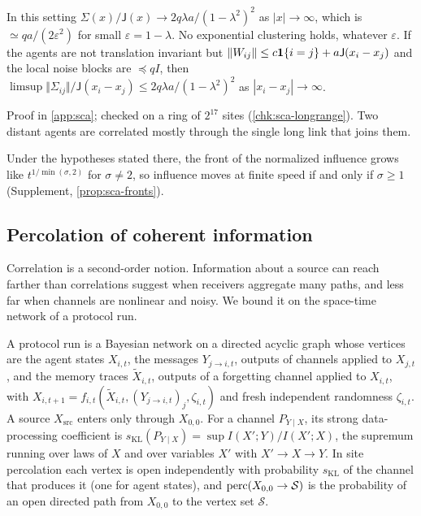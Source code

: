 \begin{proposition}\label{prop:sca-longrange}
In this setting $\Sigma(x)/\mathsf J(x)\to2q\lambda a/(1-\lambda^2)^2$ as $|x|\to\infty$, which is $\simeq qa/(2\varepsilon^2)$ for small $\varepsilon=1-\lambda$. No exponential clustering holds, whatever $\varepsilon$. If the agents are not translation invariant but $\Vert W_{ij}\Vert\le c\mathbf{1}\{i=j\}+a\mathsf J(x_i-x_j)$ and the local noise blocks are $\preceq qI$, then $\limsup\Vert\Sigma_{ij}\Vert/\mathsf J(x_i-x_j)\le2q\lambda a/(1-\lambda^2)^2$ as $|x_i-x_j|\to\infty$.
\end{proposition}
Proof in \cref{app:sca}; checked on a ring of $2^{17}$ sites (\cref{chk:sca-longrange}). Two distant agents are correlated mostly through the single long link that joins them.

Under the hypotheses stated there, the front of the normalized influence grows like $t^{1/\min(\sigma,2)}$ for $\sigma\neq2$, so influence moves at finite speed if and only if $\sigma\ge1$ (Supplement, \cref{prop:sca-fronts}).

\subsection{Percolation of coherent information}\label{sec:sca-percolation}

Correlation is a second-order notion. Information about a source can reach farther than correlations suggest when receivers aggregate many paths, and less far when channels are nonlinear and noisy. We bound it on the space-time network of a protocol run.

\begin{definition}\label{def:sca-spacetime}
A protocol run is a Bayesian network on a directed acyclic graph whose vertices are the agent states $X_{i,t}$, the messages $Y_{j\to i,t}$, outputs of channels applied to $X_{j,t}$, and the memory traces $\tilde X_{i,t}$, outputs of a forgetting channel applied to $X_{i,t}$, with $X_{i,t+1}=f_{i,t}(\tilde X_{i,t},(Y_{j\to i,t})_j,\zeta_{i,t})$ and fresh independent randomness $\zeta_{i,t}$. A source $X_{\mathrm{src}}$ enters only through $X_{0,0}$. For a channel $P_{Y\mid X}$, its strong data-processing coefficient is $s_{\mathrm{KL}}(P_{Y\mid X})=\sup I(X';Y)/I(X';X)$, the supremum running over laws of $X$ and over variables $X'$ with $X'\to X\to Y$. In site percolation each vertex is open independently with probability $s_{\mathrm{KL}}$ of the channel that produces it (one for agent states), and $\operatorname{perc}(X_{0,0}\to\mathcal S)$ is the probability of an open directed path from $X_{0,0}$ to the vertex set $\mathcal S$.
\end{definition}

